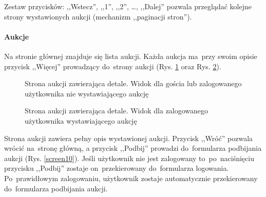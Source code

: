Zestaw przycisków: ,,Wstecz'', ,,1'', ,,2'', \ldots, ,,Dalej'' pozwala przeglądać kolejne strony wystawionych aukcji (mechanizm ,,paginacji stron'').


\paragraph{Aukcje}

Na stronie głównej znajduje się lista aukcji. Każda aukcja ma~przy swoim opisie przycisk ,,Więcej'' prowadzący do~strony aukcji (Rys. \ref{screen09} oraz Rys. \ref{screen05}).

\begin{figure}[h]
\centering
{}
\caption{Strona aukcji zawierająca detale. Widok dla gościa lub zalogowanego użytkownika nie wystawiającego aukcję}
\label{screen09}
\end{figure}

\begin{figure}[h]
\centering
{}
\caption{Strona aukcji zawierająca detale. Widok dla zalogowanego użytkownika wystawiającego aukcję}
\label{screen05}
\end{figure}

Strona aukcji zawiera pełny opis wystawionej aukcji. Przycisk ,,Wróć'' pozwala wrócić na~stronę główną, a przycisk ,,Podbij'' prowadzi do~formularza podbijania aukcji (Rys. \ref{screen10}). Jeśli użytkownik nie jest zalogowany to~po~naciśnięciu przycisku ,,Podbij'' zostaje on~przekierowany do~formularza logowania. Po~prawidłowym zalogowaniu, użytkownik zostaje automatycznie przekierowany do~formularza podbijania aukcji.

